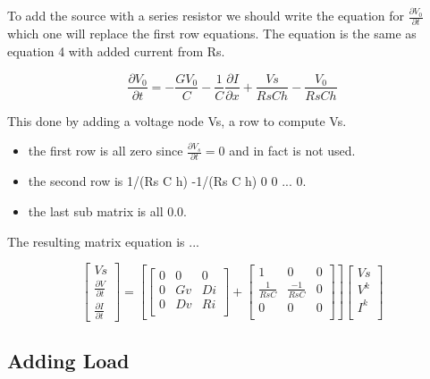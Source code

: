 \documentclass[12pt, letterpaper]{article}
\begin{document}
To add the source with a series resistor we should write the equation for $\frac{\partial{V_0}}{\partial{t}}$ which one will replace the first row equations. The equation is the same as equation 4 with added current from Rs.

\begin{equation} \frac{\partial{V_0}}{\partial{t}} = -\frac{G V_0}{C} - \frac{1}{C} \frac{\partial{I}}{\partial{x}} + \frac{Vs}{Rs C h} - \frac{V_0}{Rs C h}
\end{equation}



This done by adding a voltage node Vs, a row to compute Vs.

\begin{itemize}
\item the first row is all zero since $\frac{\partial V_s}{\partial t} = 0$ and in fact is not used.
\item the second row is 1/(Rs C h) -1/(Rs C h) 0 0 ... 0.
\item the last sub matrix is all 0.0.
\end{itemize}

The resulting matrix equation is ...


\begin{equation}
\begin{bmatrix}
	Vs \\
	\frac{\partial{V}}{\partial{t}} \\
	\frac{\partial{I}}{\partial{t}} 
\end{bmatrix}	
=
\left[ 
\begin{bmatrix}
	0 & 0 & 0 \\
	0 & Gv & Di \\
	0 & Dv & Ri \\
\end{bmatrix}
+
\begin{bmatrix}
	1 & 0 & 0 \\
	\frac{1}{Rs C} & \frac{-1}{Rs C} & 0 \\
	0 & 0 & 0 \\
\end{bmatrix}
\right]
\begin{bmatrix}
	Vs \\
	V^k \\
	I^k \\
\end{bmatrix}
\end{equation}

\subsection{Adding Load}
\end{document}

